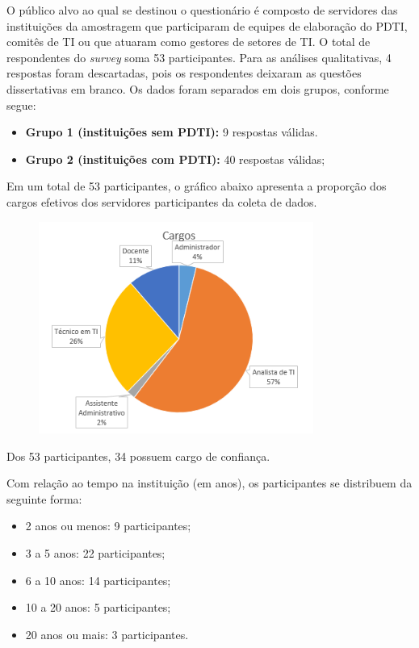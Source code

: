 O público alvo ao qual se destinou o questionário é composto de servidores das instituições da amostragem que participaram de equipes de elaboração do PDTI, comitês de TI ou que atuaram como gestores de setores de TI. O total de respondentes do \textit{survey} soma 53 participantes. Para as análises qualitativas, 4 respostas foram descartadas, pois os respondentes deixaram as questões dissertativas em branco. Os dados foram separados em dois grupos, conforme segue:
\begin{itemize}
\item \textbf{Grupo 1 (instituições sem PDTI):} 9 respostas válidas.
\item \textbf{Grupo 2 (instituições com PDTI):} 40 respostas válidas;
\end{itemize}

Em um total de 53 participantes, o gráfico abaixo apresenta a proporção dos cargos efetivos dos servidores participantes da coleta de dados.

\begin{figure}[h]
\centering %
\includegraphics[width=9cm]{figuras/apendiceC_cargos.png}
\end{figure}

Dos 53 participantes, 34 possuem cargo de confiança.

Com relação ao tempo na instituição (em anos), os participantes se distribuem da seguinte forma:
\begin{itemize}
\item 2 anos ou menos: 9 participantes;
\item 3 a 5 anos: 22 participantes;
\item 6 a 10 anos: 14 participantes;
\item 10 a 20 anos: 5 participantes;
\item 20 anos ou mais: 3 participantes.
\end{itemize}

